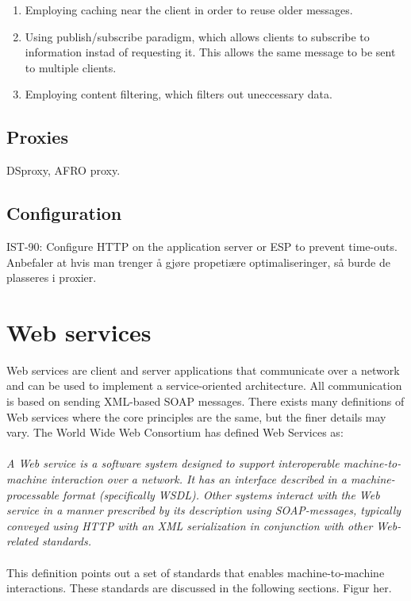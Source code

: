 \documentclass[USenglish]{ifimaster}
\begin{document}
\begin{enumerate}
    \item Employing caching near the client in order to reuse older messages.
    \item Using publish/subscribe paradigm, which allows clients to subscribe to
    information instad of requesting it. This allows the same message to be sent
    to multiple clients.
    \item Employing content filtering, which filters out uneccessary data.
\end{enumerate}

\subsection{Proxies}
DSproxy, AFRO proxy.

\subsection{Configuration}
IST-90: Configure HTTP on the application server or ESP to prevent time-outs.
Anbefaler at hvis man trenger å gjøre propetiære optimaliseringer, så burde de
plasseres i proxier.


\section{Web services}
\label{web-services}
Web services are client and server applications that communicate over a network
and can be used to implement a service-oriented architecture. All communication
is based on sending XML-based SOAP messages. There exists many definitions of
Web services where the core principles are the same, but the finer details may
vary. The World Wide Web Consortium has defined Web Services
as\cite{wrc-web-service}:
\paragraph{}
\textit{
    A Web service is a software system designed to support interoperable
    machine-to-machine interaction over a network. It has an interface described in
    a machine-processable format (specifically WSDL). Other systems interact with
    the Web service in a manner prescribed by its description using SOAP-messages,
    typically conveyed using HTTP with an XML serialization in conjunction with
    other Web-related standards.
}

\paragraph{}
This definition points out a set of standards that enables machine-to-machine
interactions. These standards are discussed in the following sections.
Figur her.
\end{document}
